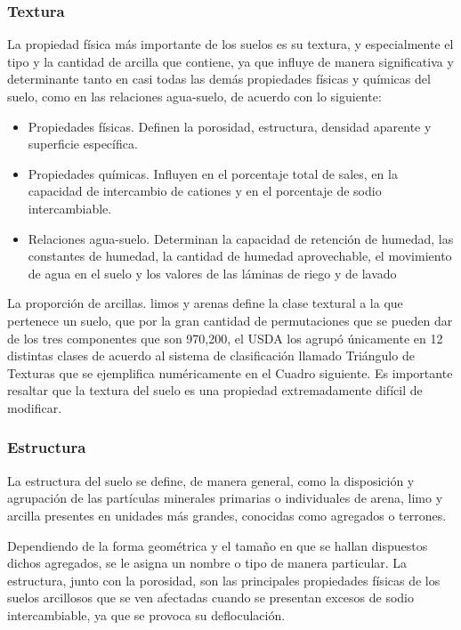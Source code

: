 \subsubsection{Textura}
La propiedad física más importante de los suelos es su textura, y especialmente el tipo y la cantidad de arcilla que contiene, ya que influye de manera significativa y determinante tanto en casi todas las demás propiedades físicas y químicas del suelo, como en las relaciones agua-suelo, de acuerdo con lo siguiente:
\begin{itemize}
  \item Propiedades físicas. Definen la porosidad, estructura, densidad aparente y superficie específica.
  \item Propiedades químicas. Influyen en el porcentaje total de sales, en la capacidad de intercambio de cationes y en el porcentaje de sodio intercambiable.
  \item Relaciones agua-suelo. Determinan la capacidad de retención de humedad, las constantes de humedad, la cantidad de humedad aprovechable, el movimiento de agua en el suelo y los valores de las láminas de riego y de lavado
\end{itemize}
La proporción de arcillas. limos y arenas define la clase textural a la que pertenece un suelo, que por la gran cantidad de permutaciones que se pueden dar de los tres componentes que son 970,200, el USDA los agrupó únicamente en 12 distintas clases de acuerdo al sistema de clasificación llamado Triángulo de Texturas que se ejemplifica numéricamente en el Cuadro siguiente. Es importante resaltar que la textura del suelo es una propiedad extremadamente difícil de modificar.

\subsubsection{Estructura}
La estructura del suelo se define, de manera general, como la disposición y
agrupación de las partículas minerales primarias o individuales de arena, limo y
arcilla presentes en unidades más grandes, conocidas como agregados o terrones.

Dependiendo de la forma geométrica y el tamaño en que se hallan dispuestos
dichos agregados, se le asigna un nombre o tipo de manera particular.
La estructura, junto con la porosidad, son las principales propiedades físicas de los
suelos arcillosos que se ven afectadas cuando se presentan excesos de sodio
intercambiable, ya que se provoca su defloculación.

